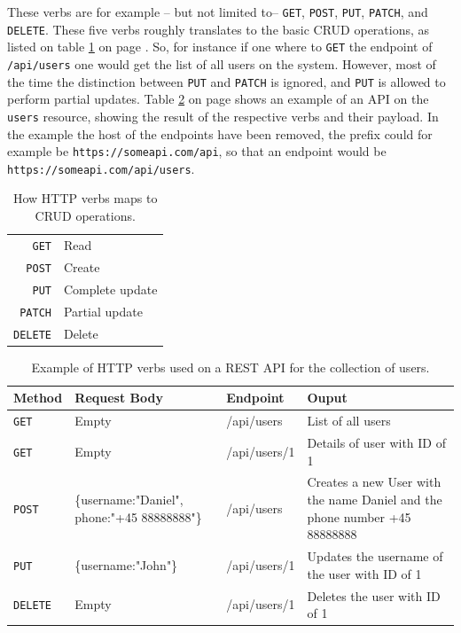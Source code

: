 			These verbs are for example -- but not limited to-- \verb=GET=, \verb=POST=, \verb=PUT=, \verb=PATCH=, and \verb=DELETE=. These five verbs roughly translates to the basic CRUD operations, as listed on table \ref{tbl:verbs} on page \pageref{tbl:verbs}. So, for instance if one where to \verb=GET= the endpoint of \verb=/api/users= one would get the list of all users on the system. However, most of the time the distinction between \verb=PUT= and \verb=PATCH= is ignored, and \verb=PUT= is allowed to perform partial updates. Table \ref{tbl:rest_example} on page \pageref{tbl:rest_example} shows an example of an API on the \verb=users= resource, showing the result of the respective verbs and their payload. In the example the host of the endpoints have been removed, the prefix could for example be \verb=https://someapi.com/api=, so that an endpoint would be \verb=https://someapi.com/api/users=.

			\begin{table}
				\begin{tabular}{r|l}
					\verb=GET= 		& Read 				\\
					\verb=POST= 	& Create 			\\
					\verb=PUT= 		& Complete update 	\\
					\verb=PATCH= 	& Partial update 	\\
					\verb=DELETE= 	& Delete 			\\
				\end{tabular}

				\caption{How HTTP verbs maps to CRUD operations.}
				\label{tbl:verbs}

			\end{table}

			\begin{table}
				\begin{tabular}{p{} | p{} | p{} | p{}}
					Method & Request Body & Endpoint & Ouput \\
					\hline
					\verb=GET= & Empty & /api/users & List of all users \\
					\hline
					\verb=GET= & Empty & /api/users/1 & Details of user with ID of 1 \\
					\hline
					\verb=POST= & \{username:"Daniel", phone:"+45 88888888"\} & /api/users & Creates a new User with the name Daniel and the phone number +45 88888888 \\
					\hline
					\verb=PUT= & \{username:"John"\} & /api/users/1 & Updates the username of the user with ID of 1\\
					\hline
					\verb=DELETE= & Empty & /api/users/1 & Deletes the user with ID of 1\\
				\end{tabular}

				\caption{Example of HTTP verbs used on a REST API for the collection of users.}
				\label{tbl:rest_example}

			\end{table}

